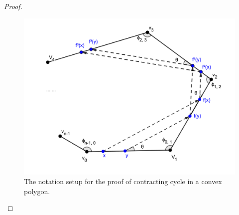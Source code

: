 \documentclass[]{styles/svproc}  %
\begin{document}
\begin{appendix}
\begin{proof}
\begin{figure}
    \includegraphics[width=0.6\linewidth]{figures/convex_cycle.png}
    \centering
    \caption{The notation setup for the proof of contracting cycle in a convex polygon.\label{fig:conv_cycle}}
    \centering
\end{figure}



\end{proof}

\end{appendix}
\end{document}
